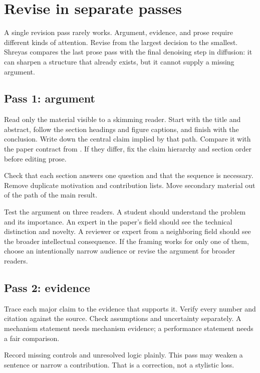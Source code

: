 \section{Revise in separate passes}
\label{sec:revision}

A single revision pass rarely works. Argument, evidence, and prose require
different kinds of attention. Revise from the largest decision to the
smallest. Shreyas compares the last prose pass with the final denoising step in
diffusion: it can sharpen a structure that already exists, but it cannot supply
a missing argument.

\subsection{Pass 1: argument}

Read only the material visible to a skimming reader. Start with the title and
abstract, follow the section headings and figure captions, and finish with the
conclusion. Write down the central claim implied by that path. Compare it with
the paper contract from . If they differ, fix the claim
hierarchy and section order before editing prose.

Check that each section answers one question and that the sequence is
necessary. Remove duplicate motivation and contribution lists. Move secondary
material out of the path of the main result.

Test the argument on three readers. A student should understand the problem and
its importance. An expert in the paper's field should see the technical
distinction and novelty. A reviewer or expert from a neighboring field should
see the broader intellectual consequence. If the framing works for only one of
them, choose an intentionally narrow audience or revise the argument for
broader readers.

\subsection{Pass 2: evidence}

Trace each major claim to the evidence that supports it. Verify every number
and citation against the source. Check assumptions and uncertainty separately.
A mechanism statement needs mechanism evidence; a performance statement needs
a fair comparison.

Record missing controls and unresolved logic plainly. This pass may weaken a
sentence or narrow a contribution. That is a correction, not a stylistic loss.

